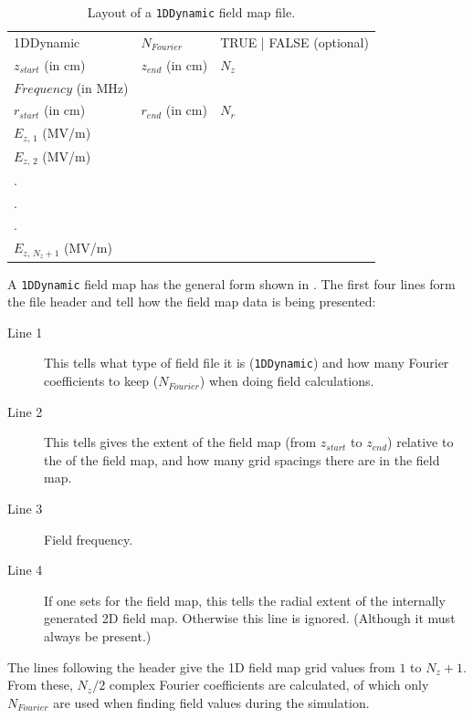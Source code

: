 \begin{table}[ht!]
    \caption{Layout of a \texttt{1DDynamic} field map file.}
    \label{tab:1DDynamic}
    \begin{center}
    \begin{tabular}{lll}
      \hline
      1DDynamic & $N_{Fourier}$ & TRUE | FALSE (optional) \\
      $z_{start}$ (in cm) & $z_{end}$ (in cm) & $N_{z}$ \\
      $Frequency$ (in MHz)& & \\
      $r_{start}$ (in cm) & $r_{end}$ (in cm) & $N_{r}$ \\
      $E_{z,\,1}$ (MV/m) & & \\
      $E_{z,\,2}$ (MV/m) & & \\
      . & & \\
      . & & \\
      . & & \\
      $E_{z,\,N_{z} + 1}$ (MV/m) & & \\
      \hline
    \end{tabular}
    \end{center}
\end{table}

A \texttt{1DDynamic} field map has the general form shown in . The first four lines form
the file header and tell \opalt how the field map data is being presented:

\begin{description}
\item[Line 1] This tells \opalt what type of field file it is (\texttt{1DDynamic}) and how many Fourier coefficients to
  keep ($N_{Fourier}$) when doing field calculations.
\item[Line 2] This tells gives the extent of the field map (from $z_{start}$ to $z_{end}$) relative to the  of
  the field map, and how many grid spacings there are in the field map.
\item[Line 3] Field frequency.
\item[Line 4] If one sets  for the field map, this tells \opalt the radial extent of the internally
  generated 2D field map. Otherwise this line is ignored. (Although it must always be present.)
\end{description}

The lines following the header give the 1D field map grid values from $1$ to $N_{z} + 1$. From these, $N_{z}/2$
complex Fourier coefficients are calculated, of which only $N_{Fourier}$ are used when finding field values during the
simulation.

